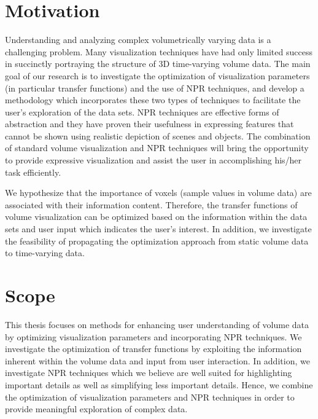 \section{Motivation \label{motivation}}
Understanding and analyzing complex volumetrically varying data is a challenging problem.
Many visualization techniques have had only limited success in succinctly portraying the structure of 3D time-varying volume data.
The main goal of our research is to investigate the optimization of visualization parameters (in particular transfer functions) and the use of NPR techniques, and develop a methodology which incorporates these two types of techniques to facilitate the user's exploration of the data sets. NPR techniques are effective forms of abstraction and they have proven their usefulness in expressing features that cannot be shown using realistic depiction of scenes and objects. The combination of standard volume visualization and NPR techniques will bring the opportunity to provide expressive visualization and assist the user in accomplishing his/her task efficiently.

We hypothesize that the importance of voxels (sample values in volume data) are associated with their information content. Therefore, the transfer functions of volume visualization can be optimized based on the information within the data sets and user input which indicates the user's interest.
In addition, we investigate the feasibility of propagating the optimization approach from static volume data to time-varying data.


\section{Scope}
This thesis focuses on methods for enhancing user understanding of volume data by optimizing visualization parameters and incorporating NPR techniques.
We investigate the optimization of transfer functions by exploiting the information inherent within the volume data and input from user interaction.
In addition, we investigate NPR techniques which we believe are well suited for highlighting important details as well as simplifying less important details. Hence, we combine the optimization of visualization parameters and NPR techniques in order to provide meaningful exploration of complex data.

